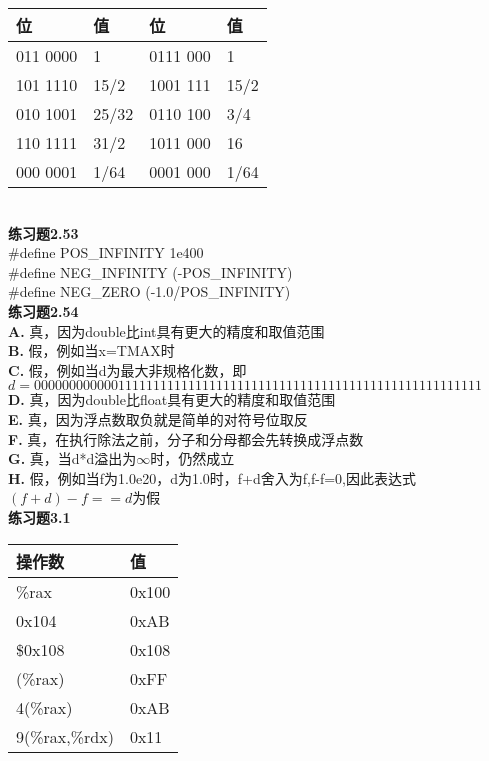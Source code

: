 \documentclass{article}
\begin{document}
\begin{CJK}{UTF8}{uyhei}
\begin{table}[htbp]
\begin{tabular}{|m{5em}<{\centering}|m{5em}<{\centering}|m{5em}<{\centering}|m{5em}<{\centering}|}
	\hline
	位	&	值	&	位	&	值	\\
	\hline
	011 0000	&	1	&	0111 000	&	1	\\
	\hline
	101 1110	&	15/2	&	1001 111	&	15/2	\\
	\hline
	010 1001	&	25/32	&	0110 100	&	3/4	\\
	\hline
	110 1111	&	31/2	&	1011 000	&	16	\\
	\hline
	000 0001	&	1/64	&	0001 000	&	1/64	\\
	\hline
\end{tabular}
\end{table}	\\[2ex]
\textbf{练习题2.53}	\\[2ex]
\#define POS\_INFINITY	1e400	\\
\#define NEG\_INFINITY	(-POS\_INFINITY)	\\
\#define NEG\_ZERO	(-1.0/POS\_INFINITY)	\\[3ex]
\textbf{练习题2.54}	\\[2ex]
\textbf{A.}	
真，因为double比int具有更大的精度和取值范围	\\
\textbf{B.}	
假，例如当x=TMAX时	\\
\textbf{C.}	
假，例如当d为最大非规格化数，即$d=0 00000000000 1111111111111111111111111111111111111111111111111111$	\\
\textbf{D.}	
真，因为double比float具有更大的精度和取值范围	\\
\textbf{E.}	
真，因为浮点数取负就是简单的对符号位取反	\\
\textbf{F.}	
真，在执行除法之前，分子和分母都会先转换成浮点数	\\
\textbf{G.}	
真，当d*d溢出为$\infty$时，仍然成立	\\
\textbf{H.}	
假，例如当f为1.0e20，d为1.0时，f+d舍入为f,f-f=0,因此表达式$(f+d)-f==d$为假	\\[2ex]
\textbf{练习题3.1}	\\
\begin{table}[htbp]
\centering
\begin{tabular}{|m{15em}<{\centering}|m{8em}<{\centering}|}
	\hline
	操作数	&	值	\\
	\hline
	\%rax	&	0x100	\\
	\hline
	0x104	&	0xAB	\\
	\hline
	\$0x108	&	0x108	\\
	\hline
	(\%rax)	&	0xFF	\\
	\hline
	4(\%rax)	&	0xAB	\\
	\hline
	9(\%rax,\%rdx)	&	0x11	\\

\end{tabular}
\end{table}
\end{CJK}
\end{document}
